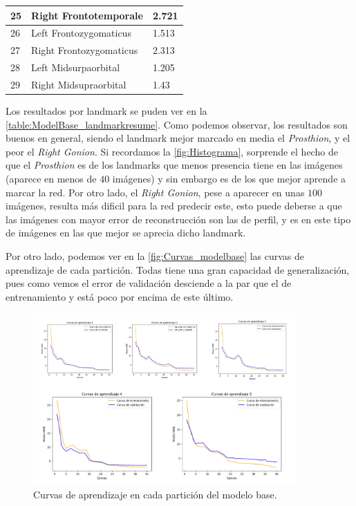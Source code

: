 \begin{table}[!ht]
\begin{tabular}{|l|l|l|}
                25 & Right Frontotemporale & 2.721 \\ \hline
                26 & Left Frontozygomaticus & 1.513 \\ \hline
                27 & Right Frontozygomaticus & 2.313 \\ \hline
                28 & Left Midsurpaorbital & 1.205 \\ \hline
                29 & Right Midsupraorbital & 1.43 \\ \hline
            \end{tabular}
            \label{table:ModelBase_landmarkresume}
        \end{table}

        \medskip

        \noindent Los resultados por landmark se puden ver en la \autoref{table:ModelBase_landmarkresume}. Como podemos observar, los resultados son buenos en general, siendo el landmark mejor marcado en media el \textit{Prosthion}, y el peor el \textit{Right Gonion}. Si recordamos la \autoref{fig:Histograma}, sorprende el hecho de que el \textit{Prosthion} es de los landmarks que menos presencia tiene en las imágenes (aparece en menos de $40$ imágenes) y sin embargo es de los que mejor aprende a marcar la red. Por otro lado, el \textit{Right Gonion}, pese a aparecer en unas $100$ imágenes, resulta más dificil para la red predecir este, esto puede deberse a que las imágenes con mayor error de reconstrucción son las de perfil, y es en este tipo de imágenes en las que mejor se aprecia dicho landmark.

        \medskip

        \noindent Por otro lado, podemos ver en la \autoref{fig:Curvas_modelbase} las curvas de aprendizaje de cada partición. Todas tiene una gran capacidad de generalización, pues como vemos el error de validación desciende a la par que el de entrenamiento y está poco por encima de este último.

        \begin{figure}[!h]
            \centering
            \includegraphics[width=0.9\textwidth]{img/curvas_aprendizaje_modelbase.png}
            \caption{Curvas de aprendizaje en cada partición del modelo base.}
            \label{fig:Curvas_modelbase}
        \end{figure}

